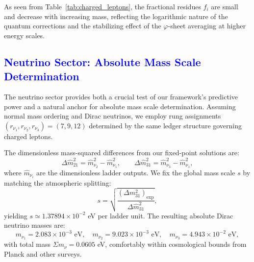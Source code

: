 \documentclass[%
amsmath,amssymb,
aps,
prb,
floatfix, showkeys, 10pt,
]{revtex4-2}
\newcommand{\modif}[1]{\textcolor{blue}{#1}}
\begin{document}
As seen from Table~\ref{tab:charged_leptons},
the fractional residues $f_i$ are small and decrease with increasing mass, reflecting the logarithmic nature of the quantum corrections and the stabilizing effect of the $\varphi$-sheet averaging at higher energy scales.














{\modif{  \subsection{Neutrino Sector: Absolute Mass Scale Determination}
\label{subsec:neutrino_results}  }}
The neutrino sector provides both a crucial test of our framework's predictive power and a natural anchor for absolute mass scale determination. Assuming normal mass ordering and Dirac neutrinos, we employ rung assignments $(r_{\nu_1}, r_{\nu_2}, r_{\nu_3}) = (7, 9, 12)$ determined by the same ledger structure governing charged leptons.

The dimensionless mass-squared differences from our fixed-point solutions are:
\begin{equation}
\Delta \hat{m}_{21}^2 = \hat{m}_{\nu_2}^2 - \hat{m}_{\nu_1}^2, \quad  \quad 
\Delta \hat{m}_{31}^2 = \hat{m}_{\nu_3}^2 - \hat{m}_{\nu_1}^2,
\end{equation}
where $\hat{m}_{\nu_i}$ are the dimensionless ladder outputs. We fix the global mass scale $s$ by matching the atmospheric splitting:
\begin{equation}
s = \sqrt{\frac{(\Delta m_{31}^2)_{\text{exp}}}{\Delta \hat{m}_{31}^2}},
\label{eq:global_scale}
\end{equation}
yielding $s \simeq 1.37894 \times 10^{-2}$ eV per ladder unit. 
The resulting absolute Dirac neutrino masses are:
\begin{equation}
m_{\nu_1} = 2.083 \times 10^{-3} \text{ eV}, \quad
m_{\nu_2} = 9.023 \times 10^{-3} \text{ eV}, \quad
m_{\nu_3} = 4.943 \times 10^{-2} \text{ eV},
\end{equation}
with total mass $\Sigma m_\nu = 0.0605$ eV, comfortably within cosmological bounds from Planck and other surveys.
\end{document}
